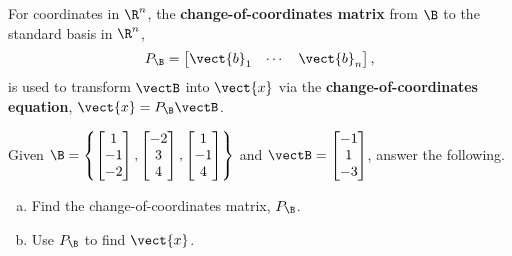 \begin{boxdef}
	For coordinates in $\R^n$, the \textbf{change-of-coordinates matrix} from $\B$ to the standard basis in $\R^n$, $$P_\B=\begin{bmatrix}\vect{b}_1&\cdots&\vect{b}_n\end{bmatrix},$$
	is used to transform $\vectB$ into $\vect{x}$ via the \textbf{change-of-coordinates equation}, $\vect{x}=P_\B\vectB$.
\end{boxdef}
\begin{exercise} %
	Given $\B=\left\{ \begin{bmatrix}1\\-1\\-2\end{bmatrix}, \begin{bmatrix}-2\\3\\4\end{bmatrix}, \begin{bmatrix}1\\-1\\4\end{bmatrix} \right\}$ and $\vectB=\begin{bmatrix}-1\\1\\-3\end{bmatrix}$, answer the following.
	\begin{multicols}{2}
		\begin{enumerate}[(a)]
			\item Find the change-of-coordinates matrix, $P_\B$.
			\item Use $P_\B$ to find $\vect{x}$.
		\end{enumerate}
	\end{multicols}
\end{exercise}
\vfill


\newpage


